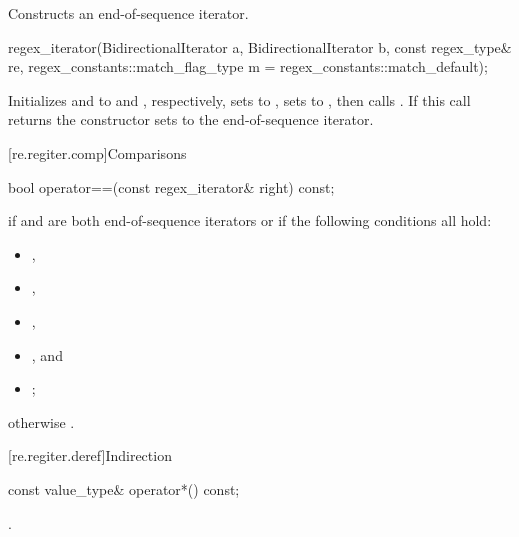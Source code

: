 \begin{itemdescr}
\pnum
\effects
Constructs an end-of-sequence iterator.
\end{itemdescr}

%
\begin{itemdecl}
regex_iterator(BidirectionalIterator a, BidirectionalIterator b,
               const regex_type& re,
               regex_constants::match_flag_type m = regex_constants::match_default);
\end{itemdecl}

\begin{itemdescr}
\pnum
\effects
Initializes  and  to
 and , respectively, sets
 to , sets  to
, then calls . If this
call returns  the constructor sets  to the end-of-sequence
iterator.
\end{itemdescr}

[re.regiter.comp]{Comparisons}

%
\begin{itemdecl}
bool operator==(const regex_iterator& right) const;
\end{itemdecl}

\begin{itemdescr}
\pnum
\returns
{} if  and  are both end-of-sequence
iterators or if the following conditions all hold:
\begin{itemize}
\item {},
\item {},
\item {},
\item {}, and
\item {};
\end{itemize}
otherwise .
\end{itemdescr}

[re.regiter.deref]{Indirection}

%
\begin{itemdecl}
const value_type& operator*() const;
\end{itemdecl}

\begin{itemdescr}
\pnum
\returns
{}.
\end{itemdescr}

